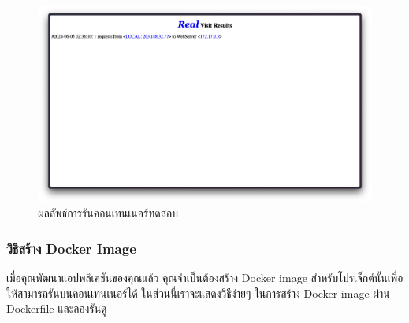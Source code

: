 \begin{figure}[ht]
    \begin{center}
        \includegraphics[scale=0.2]{images/simpleDockerRunResult.png}
    \end{center}
    \caption[Simple container running result]{ผลลัพธ์การรันคอนเทนเนอร์ทดสอบ}
    \label{fig:org}
\end{figure}

\clearpage
\subsubsection{วิธีสร้าง Docker Image}

เมื่อคุณพัฒนาแอปพลิเคชันของคุณแล้ว คุณจำเป็นต้องสร้าง Docker image สำหรับโปรเจ็กต์นั้นเพื่อให้สามารถรันบนคอนเทนเนอร์ได้ ในส่วนนี้เราจะแสดงวิธีง่ายๆ ในการสร้าง Docker image ผ่าน Dockerfile และลองรันดู

